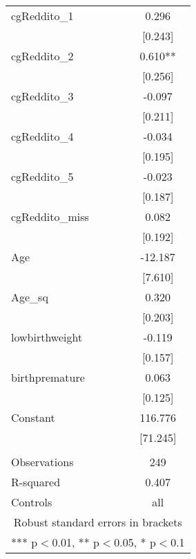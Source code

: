 \documentclass[]{article}
\begin{document}
\begin{tabular}{lc}
cgReddito\_1 & 0.296 \\
 & [0.243] \\
cgReddito\_2 & 0.610** \\
 & [0.256] \\
cgReddito\_3 & -0.097 \\
 & [0.211] \\
cgReddito\_4 & -0.034 \\
 & [0.195] \\
cgReddito\_5 & -0.023 \\
 & [0.187] \\
cgReddito\_miss & 0.082 \\
 & [0.192] \\
Age & -12.187 \\
 & [7.610] \\
Age\_sq & 0.320 \\
 & [0.203] \\
lowbirthweight & -0.119 \\
 & [0.157] \\
birthpremature & 0.063 \\
 & [0.125] \\
Constant & 116.776 \\
 & [71.245] \\
 &  \\
Observations & 249 \\
R-squared & 0.407 \\
 Controls & all \\ \hline
\multicolumn{2}{c}{ Robust standard errors in brackets} \\
\multicolumn{2}{c}{ *** p$<$0.01, ** p$<$0.05, * p$<$0.1} \\
\end{tabular}
\end{document}
